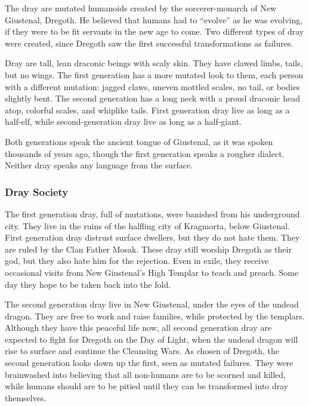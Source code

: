 The dray are mutated humanoids created by the sorcerer-monarch of New Giustenal, Dregoth. He believed that humans had to ``evolve'' as he was evolving, if they were to be fit servants in the new age to come. Two different types of dray were created, since Dregoth saw the first successful transformations as failures.

Dray are tall, lean draconic beings with scaly skin. They have clawed limbs, tails, but no wings. The first generation has a more mutated look to them, each person with a different mutation: jagged claws, uneven mottled scales, no tail, or bodies slightly bent. The second generation has a long neck with a proud draconic head atop, colorful scales, and whiplike tails. First generation dray live as long as a half-elf, while second-generation dray live as long as a half-giant.

Both generations speak the ancient tongue of Giustenal, as it was spoken thousands of years ago, though the first generation speaks a rougher dialect. Neither dray speaks any language from the surface.

\subsubsection{Dray Society}
The first generation dray, full of mutations, were banished from his underground city. They live in the ruins of the halfling city of Kragmorta, below Giustenal. First generation dray distrust surface dwellers, but they do not hate them. They are ruled by the Clan Father Mosak. These dray still worship Dregoth as their god, but they also hate him for the rejection. Even in exile, they receive occasional visits from New Giustenal's High Templar to teach and preach. Some day they hope to be taken back into the fold.

The second generation dray live in New Giustenal, under the eyes of the undead dragon. They are free to work and raise families, while protected by the templars. Although they have this peaceful life now, all second generation dray are expected to fight for Dregoth on the Day of Light, when the undead dragon will rise to surface and continue the Cleansing Wars. As chosen of Dregoth, the second generation looks down up the first, seen as mutated failures. They were brainwashed into believing that all non-humans are to be scorned and killed, while humans should are to be pitied until they can be transformed into dray themselves.

